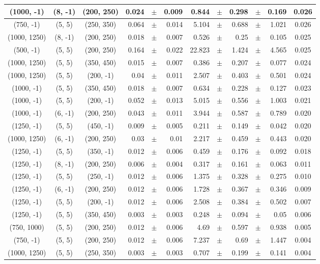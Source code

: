 \documentclass[12pt]{paper}
\begin{document}
\begin{table}[ht]
\begin{center}
{\begin{tabular}{|c|c|c|rrr|rrrrr|c|}
(1000, -1)&(8, -1)&(200, 250)&0.024&$\pm$&0.009&0.844&$\pm$&0.298&$\pm$&0.169&0.026\\\hline
(750, -1)&(5, 5)&(250, 350)&0.064&$\pm$&0.014&5.104&$\pm$&0.688&$\pm$&1.021&0.026\\\hline
(1000, 1250)&(8, -1)&(200, 250)&0.018&$\pm$&0.007&0.526&$\pm$&0.25&$\pm$&0.105&0.025\\\hline
(500, -1)&(5, 5)&(200, 250)&0.164&$\pm$&0.022&22.823&$\pm$&1.424&$\pm$&4.565&0.025\\\hline
(1000, 1250)&(5, 5)&(350, 450)&0.015&$\pm$&0.007&0.386&$\pm$&0.207&$\pm$&0.077&0.024\\\hline
(1000, 1250)&(5, 5)&(200, -1)&0.04&$\pm$&0.011&2.507&$\pm$&0.403&$\pm$&0.501&0.024\\\hline
(1000, -1)&(5, 5)&(350, 450)&0.018&$\pm$&0.007&0.634&$\pm$&0.228&$\pm$&0.127&0.023\\\hline
(1000, -1)&(5, 5)&(200, -1)&0.052&$\pm$&0.013&5.015&$\pm$&0.556&$\pm$&1.003&0.021\\\hline
(1000, -1)&(6, -1)&(200, 250)&0.043&$\pm$&0.011&3.944&$\pm$&0.587&$\pm$&0.789&0.020\\\hline
(1250, -1)&(5, 5)&(450, -1)&0.009&$\pm$&0.005&0.211&$\pm$&0.149&$\pm$&0.042&0.020\\\hline
(1000, 1250)&(6, -1)&(200, 250)&0.03&$\pm$&0.01&2.217&$\pm$&0.459&$\pm$&0.443&0.020\\\hline
(1250, -1)&(5, 5)&(350, -1)&0.012&$\pm$&0.006&0.459&$\pm$&0.176&$\pm$&0.092&0.018\\\hline
(1250, -1)&(8, -1)&(200, 250)&0.006&$\pm$&0.004&0.317&$\pm$&0.161&$\pm$&0.063&0.011\\\hline
(1250, -1)&(5, 5)&(250, -1)&0.012&$\pm$&0.006&1.375&$\pm$&0.328&$\pm$&0.275&0.010\\\hline
(1250, -1)&(6, -1)&(200, 250)&0.012&$\pm$&0.006&1.728&$\pm$&0.367&$\pm$&0.346&0.009\\\hline
(1250, -1)&(5, 5)&(200, -1)&0.012&$\pm$&0.006&2.508&$\pm$&0.384&$\pm$&0.502&0.007\\\hline
(1250, -1)&(5, 5)&(350, 450)&0.003&$\pm$&0.003&0.248&$\pm$&0.094&$\pm$&0.05&0.006\\\hline
(750, 1000)&(5, 5)&(200, 250)&0.012&$\pm$&0.006&4.69&$\pm$&0.597&$\pm$&0.938&0.005\\\hline
(750, -1)&(5, 5)&(200, 250)&0.012&$\pm$&0.006&7.237&$\pm$&0.69&$\pm$&1.447&0.004\\\hline
(1000, 1250)&(5, 5)&(250, 350)&0.003&$\pm$&0.003&0.707&$\pm$&0.199&$\pm$&0.141&0.004\\\hline

\end{tabular}}
\end{center}
\end{table}
\end{document}
